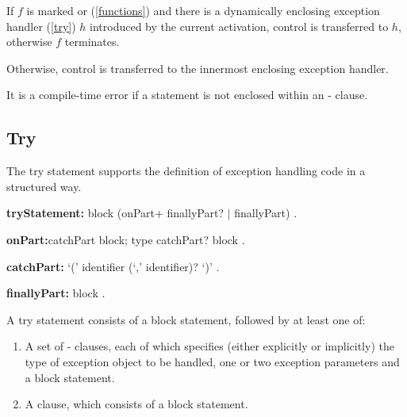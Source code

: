 \documentclass{article}
\newcommand{\code}[1]{{\sf #1}}
\begin{document}
\LMHash{}
If $f$ is marked \ASYNC{} or \ASYNC* (\ref{functions}) and there is a dynamically enclosing exception handler (\ref{try}) $h$ introduced by the current activation, control is transferred to $h$, otherwise $f$  terminates.


\LMHash{}
Otherwise, control is transferred to the  innermost enclosing exception handler.


\LMHash{}
It is a compile-time error if a  \code{\RETHROW{}} statement is not enclosed within an \ON-\CATCH{} clause. 



\subsection{ Try}

\LMHash{}
The try statement supports the definition of exception handling code in a structured way.

\begin{grammar}
{\bf tryStatement:}
      \TRY{} block (onPart+ finallyPart? $|$ finallyPart)
    .
    
 {\bf onPart:}catchPart block;
    \ON{} type catchPart? block
   .

{\bf catchPart:}
      \CATCH{} `(' identifier (`,' identifier)? `)' 
    .

{\bf finallyPart:}
      \FINALLY{} block
    .
 \end{grammar}
 
\LMHash{}
 A try statement consists of a block statement, followed by at least one of:
 \begin{enumerate}
 \item
A set of \ON{}-\CATCH{} clauses, each of which specifies  (either explicitly or implicitly) the type of exception object to be handled, one or two exception parameters and a block statement.
\item
A \FINALLY{} clause, which consists of a block statement. 
\end{enumerate}
\end{document}
